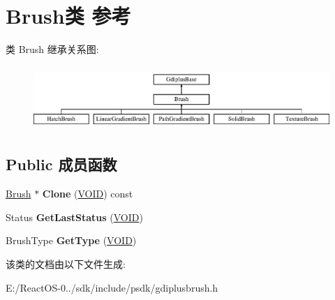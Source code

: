\hypertarget{class_brush}{}\section{Brush类 参考}
\label{class_brush}
类 Brush 继承关系图\+:\begin{figure}[H]
\begin{center}
\leavevmode
\includegraphics[height=2.452555cm]{class_brush}
\end{center}
\end{figure}
\subsection*{Public 成员函数}
\begin{DoxyCompactItemize}
\item 
\mbox{\label{class_brush_a1dac67451cc79ce052ff75a9df5ed748}} 
\hyperlink{class_brush}{Brush} $\ast$ {\bfseries Clone} (\hyperlink{interfacevoid}{V\+O\+ID}) const
\item 
\mbox{\label{class_brush_a57dacb39033ab1931426c97cd80e26e6}} 
Status {\bfseries Get\+Last\+Status} (\hyperlink{interfacevoid}{V\+O\+ID})
\item 
\mbox{\label{class_brush_a3f057694a1e55bc4e6f36fd6642a8ee5}} 
Brush\+Type {\bfseries Get\+Type} (\hyperlink{interfacevoid}{V\+O\+ID})
\end{DoxyCompactItemize}


该类的文档由以下文件生成\+:\begin{DoxyCompactItemize}
\item 
E\+:/\+React\+O\+S-\/0../sdk/include/psdk/gdiplusbrush.\+h\end{DoxyCompactItemize}
